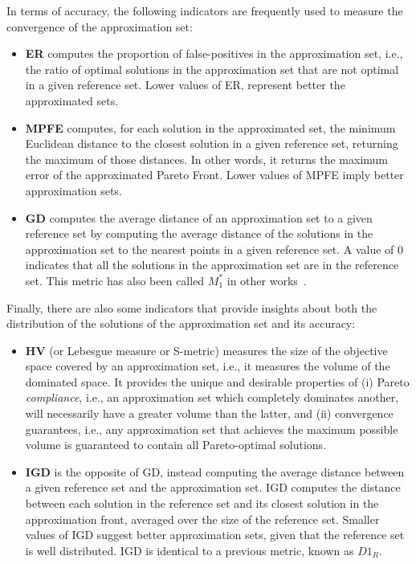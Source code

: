 In terms of accuracy, the following indicators are frequently used to measure the convergence of the approximation set:
\begin{itemize}
\item \textbf{\ac{ER}} computes the proportion of false-positives in the approximation set, i.e., the ratio of optimal solutions in the approximation set that are not optimal in a given reference set. Lower values of \ac{ER}, represent better the approximated sets. 
\item \textbf{\ac{MPFE}} computes, for each solution in the approximated set, the minimum Euclidean distance to the closest solution in a given reference set, returning the maximum of those distances. In other words, it returns the maximum error of the approximated Pareto Front. Lower values of \ac{MPFE} imply better approximation sets. 
\item \textbf{\ac{GD}} computes the average distance of an approximation set to a given reference set by computing the average distance of the solutions in the approximation set to the nearest points in a given reference set. A value of $0$ indicates that all the solutions in the approximation set are in the reference set. This metric has also been called \textbf{$M_1^\ast$} in other works~\cite{Zitzler2000m1m3}.
\end{itemize}

Finally, there are also some indicators that provide insights about both the distribution of the solutions of the approximation set and its accuracy:
\begin{itemize}
\item \textbf{\ac{HV}} (or Lebesgue measure or S-metric) measures the size of the objective space covered by an approximation set, i.e., it measures the volume of the dominated space. It provides the unique and desirable properties of (i) Pareto \textit{compliance}, i.e., an approximation set which completely dominates another, will necessarily have a greater volume than the latter, and (ii) convergence guarantees, i.e., any approximation set that achieves the maximum possible volume is guaranteed to contain all Pareto-optimal solutions.
\item \textbf{\ac{IGD}} is the opposite of \ac{GD}, instead computing the average distance between a given reference set and the approximation set. \ac{IGD} computes the distance between each solution in the reference set and its closest solution in the approximation front, averaged over the size of the reference set. Smaller values of \ac{IGD} suggest better approximation sets, given that the reference set is well distributed.  \ac{IGD} is identical to a previous metric, known as \textbf{$D1_R$}. 
\end{itemize}


